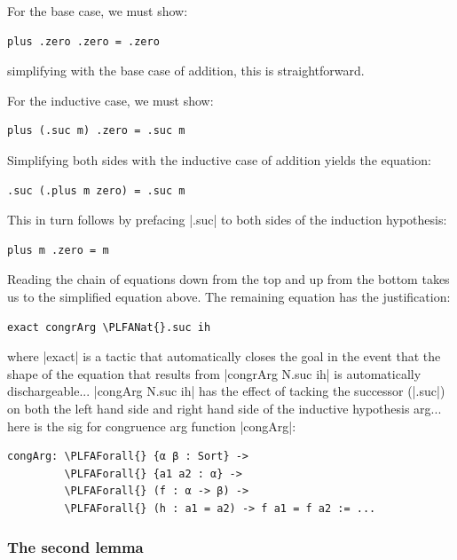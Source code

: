 \documentclass{memoir}
\newcommand{\PLFANat}{\ensuremath{\mathbb{N}}}
\newcommand{\PLFAForall}{\ensuremath{\forall}}
\begin{document}
\par
For the base case, we must show:

\par
\par\noindent \begin{verbatim}
plus .zero .zero = .zero
\end{verbatim}
simplifying with the base case of addition, this is straightforward.

\par
For the inductive case, we must show:

\par
\par\noindent \begin{verbatim}
plus (.suc m) .zero = .suc m
\end{verbatim}
Simplifying both sides with the inductive case of addition yields the equation:\begin{verbatim}
.suc (.plus m zero) = .suc m
\end{verbatim}
This in turn follows by prefacing \LeanVerb|.suc| to both sides of the induction hypothesis:\begin{verbatim}
plus m .zero = m
\end{verbatim}
Reading the chain of equations down from the top and up from the bottom takes us to
the simplified equation above. The remaining equation has the justification:\begin{verbatim}
exact congrArg \PLFANat{}.suc ih
\end{verbatim}
where \LeanVerb|exact| is a tactic that automatically closes the goal in the event that the
shape of the equation that results from \LeanVerb|congrArg N.suc ih| is automatically dischargeable...
\LeanVerb|congArg N.suc ih| has the effect of tacking the successor (\LeanVerb|.suc|) on both the
left hand side and right hand side of the inductive hypothesis arg... here is the sig
for congruence arg function \LeanVerb|congArg|:\begin{verbatim}
congArg: \PLFAForall{} {α β : Sort} ->
         \PLFAForall{} {a1 a2 : α} ->
         \PLFAForall{} (f : α -> β) ->
         \PLFAForall{} (h : a1 = a2) -> f a1 = f a2 := ...
\end{verbatim}

\par

\subsubsection{The second lemma}\label{PLFA--in--Lean----Part--1----Induction-005F-005F-005F--Proof--by--Induction----Second--proof-005F-005F-005F--commutativity----The--second--lemma}
\end{document}
